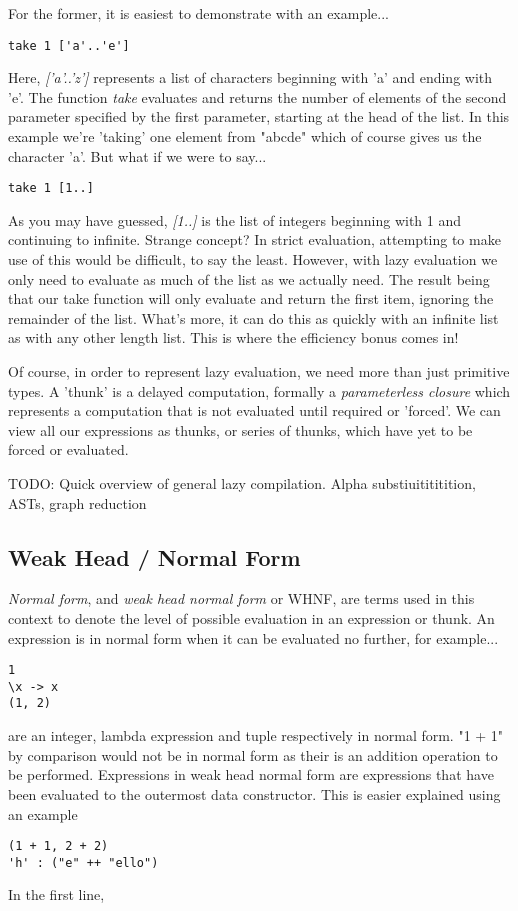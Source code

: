 \documentclass[11pt]{article}
\begin{document}
For the former, it is easiest to demonstrate with an example...
\begin{verbatim}
take 1 ['a'..'e']
\end{verbatim}
Here, \emph{['a'..'z']} represents a list of characters beginning with 'a' and 
ending with 'e'. The function \emph{take} evaluates and returns the number of
elements of the second parameter specified by the first parameter, starting at the
head of the list. In this example we're 'taking' one element from "abcde" which
of course gives us the character 'a'. But what if we were to say...
\begin{verbatim}
take 1 [1..]
\end{verbatim}
As you may have guessed, \emph{[1..]} is the list of integers beginning with 1
and continuing to infinite. Strange concept? In strict evaluation, attempting
to make use of this would be difficult, to say the least. However, with lazy 
evaluation we only need to evaluate as much of the list as we actually need.
The result being that our take function will only evaluate and return the 
first item, ignoring the remainder of the list. What's more, it can do this
as quickly with an infinite list as with any other length list. This is where the
efficiency bonus comes in!

Of course, in order to represent lazy evaluation, we need more than just 
primitive types. A 'thunk' is a delayed computation, formally a \emph{
parameterless closure} which represents a computation that is not evaluated
until required or 'forced'. We can view all our expressions as thunks, or
series of thunks, which have yet to be forced or evaluated. 

TODO: Quick overview of general lazy compilation. Alpha substiuitititition,
ASTs, graph reduction

\subsection{Weak Head / Normal Form}
\emph{Normal form}, and \emph{weak head normal form} or WHNF, are terms used
in this context to denote the level of possible evaluation in an expression
or thunk. An expression is in normal form when it can be evaluated no further,
for example...
\begin{verbatim}
1
\x -> x
(1, 2)
\end{verbatim}
are an integer, lambda expression and tuple respectively in normal form. "1 + 1"
by comparison would not be in normal form as their is an addition operation to
be performed.
Expressions in weak head normal form are expressions that have been evaluated
to the outermost data constructor. This is easier explained using an example
\begin{verbatim}
(1 + 1, 2 + 2)
'h' : ("e" ++ "ello")
\end{verbatim}
In the first line, 
\end{document}
